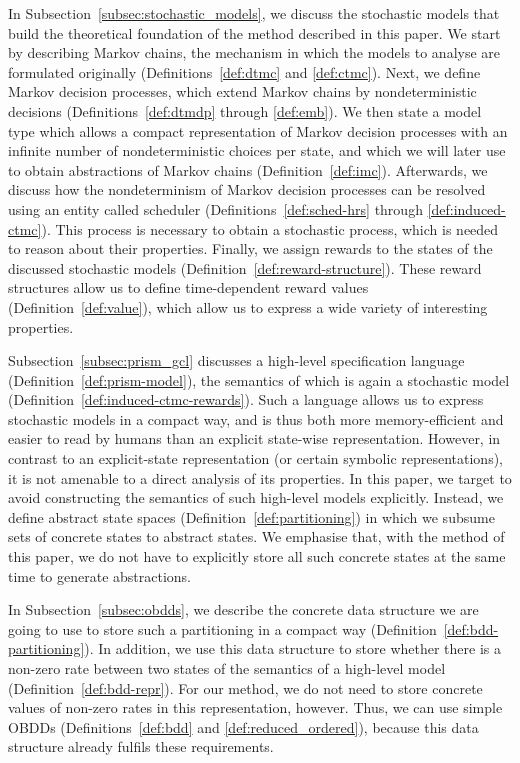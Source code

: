 \documentclass[10pt,twocolumn]{article}
\begin{document}
In Subsection~\ref{subsec:stochastic_models}, we discuss the stochastic models that build the theoretical foundation of the method described in this paper.
We start by describing Markov chains, the mechanism in which the models to analyse are formulated originally (Definitions~\ref{def:dtmc} and \ref{def:ctmc}).
Next, we define Markov decision processes, which extend Markov chains by nondeterministic decisions (Definitions~\ref{def:dtmdp} through \ref{def:emb}).
We then state a model type which allows a compact representation of Markov decision processes with an infinite number of nondeterministic choices per
state, and which we will later use to obtain abstractions of Markov chains (Definition~\ref{def:imc}).
Afterwards, we discuss how the nondeterminism of Markov decision processes can be resolved using an entity called scheduler (Definitions~\ref{def:sched-hrs} through \ref{def:induced-ctmc}). 
This process is necessary to obtain a stochastic process, which is needed to reason about their properties.
Finally, we assign rewards to the states of the discussed stochastic models (Definition~\ref{def:reward-structure}).
These reward structures allow us to define time-dependent reward values (Definition~\ref{def:value}), which allow us to express a wide variety of interesting properties.

Subsection~\ref{subsec:prism_gcl} discusses a high-level specification language (Definition~\ref{def:prism-model}), the semantics of which is again a stochastic model (Definition~\ref{def:induced-ctmc-rewards}).
Such a language allows us to express stochastic models in a compact way, and is thus both more memory-efficient and easier to read by humans than an explicit state-wise representation.
However, in contrast to an explicit-state representation (or certain symbolic representations), it is not amenable to a direct analysis of its properties.
In this paper, we target to avoid constructing the semantics of such high-level models explicitly.
Instead, we define abstract state spaces (Definition~\ref{def:partitioning}) in which we subsume sets of concrete states to abstract states.
We emphasise that, with the method of this paper, we do not have to explicitly store all such concrete states at the same time to generate abstractions.

In Subsection~\ref{subsec:obdds}, we describe the concrete data structure we are going to use to store such a partitioning in a compact way (Definition~\ref{def:bdd-partitioning}).
In addition, we use this data structure to store whether there is a non-zero rate between two states of the semantics of a high-level model (Definition~\ref{def:bdd-repr}).
For our method, we do not need to store concrete values of non-zero rates in this representation, however.
Thus, we can use simple OBDDs (Definitions~\ref{def:bdd} and \ref{def:reduced_ordered}), because this data structure already fulfils these requirements.
\end{document}
